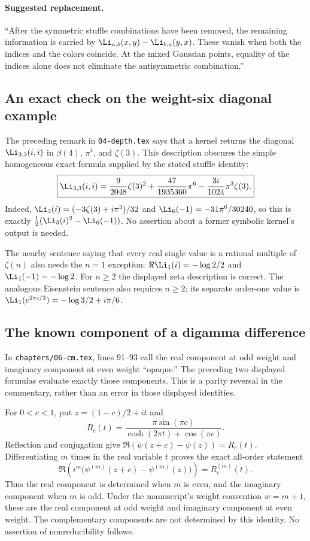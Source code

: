 \paragraph{Suggested replacement.}
``After the symmetric stuffle combinations have been removed, the
remaining information is carried by
$\Li_{a,b}(x,y)-\Li_{b,a}(y,x)$. These vanish when both the indices and
the colors coincide. At the mixed Gaussian points, equality of the
indices alone does not eliminate the antisymmetric combination.''

\subsection{An exact check on the weight-six diagonal example}

The preceding remark in \texttt{04-depth.tex} says that a kernel returns
the diagonal $\Li_{3,3}(i,i)$ in $\beta(4)$, $\pi^4$, and $\zeta(3)$.
This description obscures the simple homogeneous exact formula supplied
by the stated stuffle identity:
\[
 \boxed{\displaystyle
 \Li_{3,3}(i,i)=\frac{9}{2048}\zeta(3)^2
       +\frac{47}{1935360}\pi^6
       -\frac{3i}{1024}\pi^3\zeta(3).}
\]
Indeed, $\Li_3(i)=(-3\zeta(3)+i\pi^3)/32$ and
$\Li_6(-1)=-31\pi^6/30240$, so this is exactly
$\tfrac12(\Li_3(i)^2-\Li_6(-1))$.
No assertion about a former symbolic kernel's output is needed.

The nearby sentence saying that every real single value is a rational
multiple of $\zeta(n)$ also needs the $n=1$ exception:
$\Re\Li_1(i)=-\log2/2$ and $\Li_1(-1)=-\log2$.
For $n\geq2$ the displayed zeta description is correct.
The analogous Eisenstein sentence also requires $n\ge2$; its separate
order-one value is $\Li_1(e^{2\pi i/3})=-\log3/2+i\pi/6$.

\subsection{The known component of a digamma difference}

In \texttt{chapters/06-cm.tex}, lines 91--93 call the real component at
odd weight and imaginary component at even weight ``opaque.'' The
preceding two displayed formulas evaluate exactly those components.
This is a parity reversal in the commentary, rather than an error in
those displayed identities.

For $0<c<1$, put $z=(1-c)/2+it$ and
\[
 R_c(t)=\frac{\pi\sin(\pi c)}{\cosh(2\pi t)+\cos(\pi c)}.
\]
Reflection and conjugation give
$\Re(\psi(z+c)-\psi(z))=R_c(t)$. Differentiating $m$ times in the real
variable $t$ proves the exact all-order statement
\[
 \Re\left(i^m\bigl(\psi^{(m)}(z+c)-\psi^{(m)}(z)\bigr)\right)
       =R_c^{(m)}(t).
\]
Thus the real component is determined when $m$ is even, and the imaginary
component when $m$ is odd. Under the manuscript's weight convention
$w=m+1$, these are the real component at odd weight and imaginary component
at even weight. The complementary components are not determined by this
identity. No assertion of nonreducibility follows.

